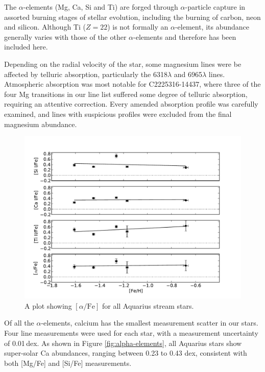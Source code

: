 \documentclass{emulateapj}
\begin{document}
The $\alpha$-elements (Mg, Ca, Si and Ti) are forged through $\alpha$-particle capture in assorted burning stages of stellar evolution, including the burning of carbon, neon and silicon. Although Ti ($Z = 22$) is not formally an $\alpha$-element, its abundance generally varies with those of the other $\alpha$-elements and therefore has been included here.

Depending on the radial velocity of the star, some magnesium lines were be affected by telluric absorption, particularly the 6318$\lambda$ and 6965$\lambda$ lines. Atmospheric absorption was most notable for C2225316-14437, where three of the four Mg transitions in our line list suffered some degree of telluric absorption, requiring an attentive correction. Every amended absorption profile was carefully examined, and lines with suspicious profiles were excluded from the final magnesium abundance.

\begin{figure}[h]
	\includegraphics[width=\columnwidth]{./figures/aquarius-alpha-fe.pdf}
	\caption{A plot showing $[\alpha/\mbox{Fe}]$ for all Aquarius stream stars.}
	\label{fig:alpha-fe}
\end{figure}

Of all the $\alpha$-elements, calcium has the smallest measurement scatter in our stars. Four line measurements were used for each star, with a measurement uncertainty of 0.01\,dex. As shown in Figure \ref{fig:alpha-elements}, all Aquarius stars show super-solar Ca abundances, ranging between 0.23 to 0.43 dex, consistent with both [Mg/Fe] and [Si/Fe] measurements. 
\end{document}
